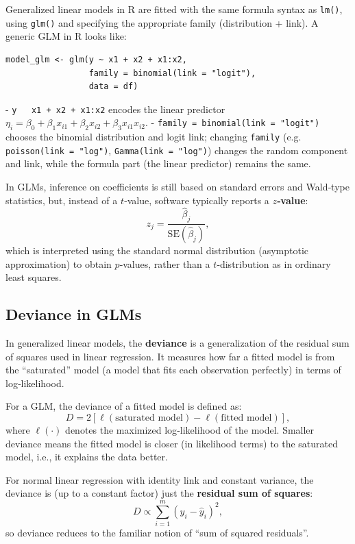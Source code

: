 Generalized linear models in R are fitted with the same formula syntax as \texttt{lm()}, using \texttt{glm()} and specifying the appropriate family (distribution + link).  
A generic GLM in R looks like:

\begin{verbatim}
model_glm <- glm(y ~ x1 + x2 + x1:x2, 
                 family = binomial(link = "logit"), 
                 data = df)
\end{verbatim}

- \texttt{y ~ x1 + x2 + x1:x2} encodes the linear predictor $\eta_i = \beta_0 + \beta_1 x_{i1} + \beta_2 x_{i2} + \beta_3 x_{i1}x_{i2}$.  
- \texttt{family = binomial(link = "logit")} chooses the binomial distribution and logit link; changing \texttt{family} (e.g. \texttt{poisson(link = "log")}, \texttt{Gamma(link = "log")}) changes the random component and link, while the formula part (the linear predictor) remains the same.



In GLMs, inference on coefficients is still based on standard errors and Wald‑type statistics, but, instead of a $t$‑value, software typically reports a \textbf{$z$‑value}:
\[
z_j = \frac{\hat\beta_j}{\text{SE}(\hat\beta_j)},
\]
which is interpreted using the standard normal distribution (asymptotic approximation) to obtain $p$‑values, rather than a $t$‑distribution as in ordinary least squares.



\subsection{Deviance in GLMs}

In generalized linear models, the \textbf{deviance} is a generalization of the residual sum of squares used in linear regression. It measures how far a fitted model is from the “saturated” model (a model that fits each observation perfectly) in terms of log‑likelihood.

For a GLM, the deviance of a fitted model is defined as:
\[
D = 2 \left[ \ell(\text{saturated model}) - \ell(\text{fitted model}) \right],
\]
where $\ell(\cdot)$ denotes the maximized log‑likelihood of the model. Smaller deviance means the fitted model is closer (in likelihood terms) to the saturated model, i.e., it explains the data better.

For normal linear regression with identity link and constant variance, the deviance is (up to a constant factor) just the \textbf{residual sum of squares}:
\[
D \propto \sum_{i=1}^m (y_i - \hat{y}_i)^2,
\]
so deviance reduces to the familiar notion of “sum of squared residuals”.

